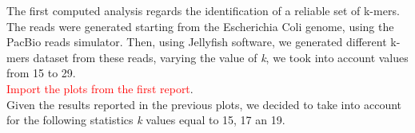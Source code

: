 \documentclass[11pt]{article}
\newcommand\myworries[1]{\textcolor{red}{#1}}
\begin{document}
The first computed analysis regards the identification of a reliable set of k-mers.
The reads were generated starting from the Escherichia Coli genome, using the PacBio reads simulator. 
Then, using Jellyfish software, we generated different k-mers dataset from these reads, varying the value of \emph{k}, we took into account values from 15 to 29.\\
\myworries{Import the plots from the first report}.\\
Given the results reported in the previous plots, we decided to take into account for the following statistics \emph{k} values equal to 15, 17 an 19.
%
%
\end{document}
